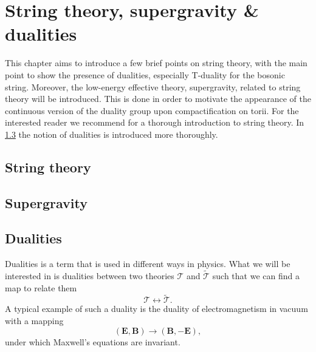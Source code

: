 \chapter{String theory, supergravity \& dualities}


This chapter aims to introduce a few brief points on string theory, with the main point to show the presence of dualities, especially T-duality for the bosonic string. Moreover, the low-energy effective theory, supergravity, related to string theory will be introduced. This is done in order to motivate the appearance of the continuous version of the duality group upon compactification on torii. For the interested reader we recommend \cite{Blumenhagen2013} for a thorough introduction to string theory. In \ref{sec:Dualities} the notion of dualities is introduced more thoroughly. 


\section{String theory}

\section{Supergravity}

\section{Dualities}\label{sec:Dualities}
Dualities is a term that is used in different ways in physics. What we will be interested in is dualities between two theories $\mathscr{T}$ and $\tilde{\mathscr{T}}$ such that we can find a map to relate them 
\begin{equation}
    \mathscr{T} \leftrightarrow \mathscr{\tilde{T}}.
\end{equation}
A typical example of such a duality is the duality of electromagnetism in vacuum with a mapping 
\begin{equation}
    \left(\mathbf{E},\mathbf{B}\right) \to \left(\mathbf{B},-\mathbf{E}\right),
\end{equation}
under which Maxwell's equations are invariant. 

